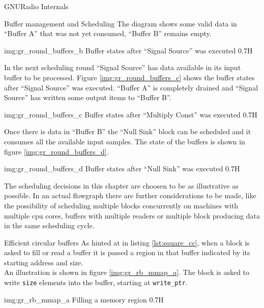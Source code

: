 \begin{subchapter}{GNURadio Internals}
\begin{subsubchapter}{Buffer management and Scheduling}
    The diagram shows some valid data in ``Buffer A'' that was
    not yet consumed, ``Buffer B'' remains empty.

                 {img:gr_round_buffers_b}
                 {Buffer states after ``Signal Source'' was executed}
                 {0.7}{H}

    In the next scheduling round ``Signal Source'' has data
    available in its input buffer to be processed.
    Figure \ref{img:gr_round_buffers_c} shows the buffer states
    after ``Signal Source'' was executed.
    ``Buffer A'' is completely drained and ``Signal Source'' has
    written some output items to ``Buffer B''.

                 {img:gr_round_buffers_c}
                 {Buffer states after ``Multiply Const'' was executed}
                 {0.7}{H}

    Once there is data in ``Buffer B'' the ``Null Sink'' block
    can be scheduled and it consumes all the available input samples.
    The state of the buffers is shown in figure \ref{img:gr_round_buffers_d}.

                 {img:gr_round_buffers_d}
                 {Buffer states after ``Null Sink'' was executed}
                 {0.7}{H}

    The scheduling decisions in this chapter are choosen to be
    as illustrative as possible. In an actual flowgraph there are
    further considerations to be made, like the possibility of scheduling
    multiple blocks concurrently on machines with multiple \gls{cpu} cores,
    buffers with multiple readers or multiple block producing data
    in the same scheduling cycle.
  \end{subsubchapter}

  \begin{subsubchapter}{Efficient circular buffers}
    As hinted at in listing \ref{lst:square_cc}, when a block
    is asked to fill or read a buffer it is passed a region in
    that buffer indicated by its starting address and size. \\

    An illustration is shown in figure \ref{img:gr_rb_mmap_a}.
    The block is asked to write \texttt{size} elements into
    the buffer, starting at \texttt{write\_ptr}.

                 {img:gr_rb_mmap_a}
                 {Filling a memory region}
                 {0.7}{H}


\end{subsubchapter}
\end{subchapter}
